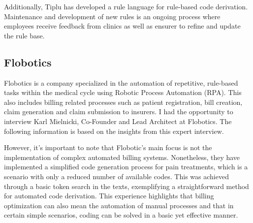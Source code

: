 Additionally, Tiplu has developed a rule language for rule-based code derivation.
Maintenance and development of new rules is an ongoing process where employees receive feedback from clinics as well as ensurer to refine and update the rule base.


\subsection{Flobotics}
Flobotics is a company specialized in the automation of repetitive, rule-based tasks within the medical cycle using Robotic Process Automation (RPA).
This also includes billing related processes such as patient registration, bill creation, claim generation and claim submission to insurers.
I had the opportunity to interview Karl Mielnicki, Co-Founder and Lead Architect at Flobotics.
The following information is based on the insights from this expert interview.

However, it's important to note that Flobotic's main focus is not the implementation of complex automated billing systems.
Nonetheless, they have implemented a simplified code generation process for pain treatments, which is a scenario with only a reduced number of available codes.
This was achieved through a basic token search in the texts, exemplifying a straightforward method for automated code derivation.
This experience highlights that billing optimization can also mean the automation of manual processes and that in certain simple scenarios,
coding can be solved in a basic yet effective manner.

